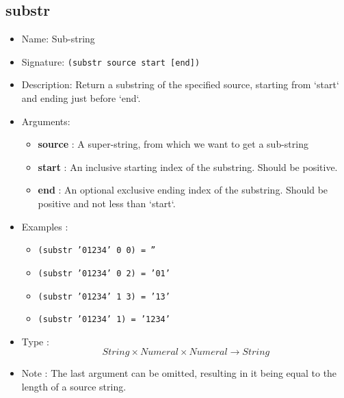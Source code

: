 \subsection{substr}
\begin{itemize}
    \item Name: Sub-string
    \item Signature: \texttt{(substr source start [end])}
    \item Description: Return a substring of the specified source, starting from `start` and ending just before `end`.
    \item Arguments:
        \begin{itemize}
            \item \textbf{source} : A super-string, from which we want to get a sub-string
            \item \textbf{start} : An inclusive starting index of the substring. Should be positive.
            \item \textbf{end} : An optional exclusive ending index of the substring. Should be positive and not less than
                `start`.
        \end{itemize}
    \item Examples :
        \begin{itemize}
            \item \texttt{(substr '01234' 0 0) = ''}
            \item \texttt{(substr '01234' 0 2) = '01'}
            \item \texttt{(substr '01234' 1 3) = '13'}
            \item \texttt{(substr '01234' 1) = '1234'}
        \end{itemize}
    \item Type : \[String \times Numeral \times Numeral \to String\]
    \item Note : The last argument can be omitted, resulting in it being equal to the length of a source string.
\end{itemize}

